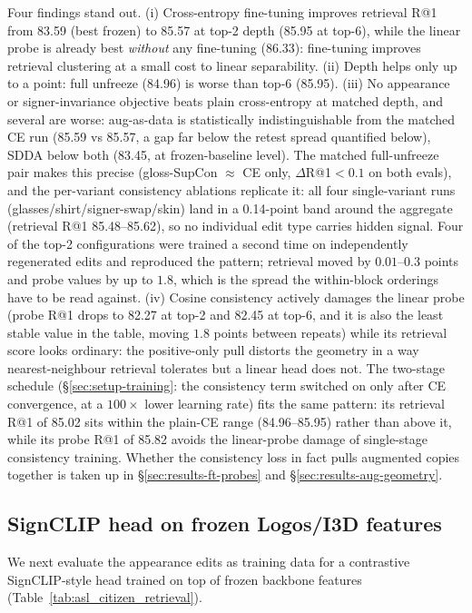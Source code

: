 Four findings stand out. (i) Cross-entropy fine-tuning improves retrieval R@1
from 83.59 (best frozen) to 85.57 at top-2 depth (85.95 at top-6), while
the linear probe is already best \emph{without} any fine-tuning (86.33):
fine-tuning improves retrieval clustering at a small cost to linear
separability. (ii) Depth helps only up to a point: full unfreeze (84.96)
is worse than top-6 (85.95). (iii) No appearance or
signer-invariance objective beats plain cross-entropy at matched depth,
and several are worse: aug-as-data is statistically indistinguishable
from the matched CE run (85.59 vs 85.57, a gap far below the retest
spread quantified below), SDDA below both (83.45, at
frozen-baseline level). The
matched full-unfreeze pair makes this precise
(gloss-SupCon $\approx$ CE only, $\Delta$R@1$<0.1$ on both evals),
and the per-variant consistency ablations replicate it: all four
single-variant runs (glasses/shirt/signer-swap/skin) land in a 0.14-point
band around the aggregate (retrieval R@1 85.48--85.62), so no individual edit
type carries hidden signal. Four of the top-2 configurations were
trained a second time on independently regenerated edits and reproduced
the pattern; retrieval moved by $0.01$--$0.3$ points and probe values by
up to $1.8$, which is the spread the within-block orderings have to be
read against. (iv) Cosine consistency actively damages the
linear probe (probe R@1 drops to 82.27 at top-2 and 82.45 at top-6,
and it is also the least stable value in the table, moving $1.8$ points
between repeats) while its retrieval score
looks ordinary: the positive-only pull distorts the geometry in a way
nearest-neighbour retrieval tolerates but a linear head does not. The
two-stage schedule (\S\ref{sec:setup-training}: the consistency term
switched on only after CE convergence, at a $100\times$ lower learning
rate) fits the same pattern: its retrieval R@1 of 85.02 sits within the
plain-CE range (84.96--85.95) rather than above it, while its probe R@1
of 85.82 avoids the linear-probe damage of single-stage consistency
training. 
Whether the consistency loss in fact pulls augmented copies together is
taken up in \S\ref{sec:results-ft-probes} and
\S\ref{sec:results-aug-geometry}.

\subsection{SignCLIP head on frozen Logos/I3D features}
We next evaluate the appearance edits as training data for a contrastive
SignCLIP-style head trained on top of frozen backbone features
(Table~\ref{tab:asl_citizen_retrieval}).

